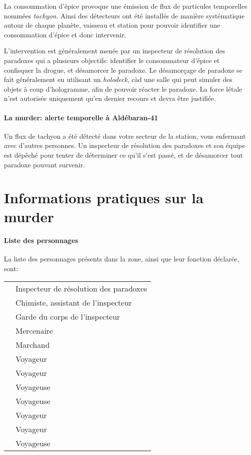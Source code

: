 {{		%
		\par La consommation d'épice provoque une émission de flux de particules temporelles nommées \emph{tachyon}. Ainsi des détecteurs ont été installés de manière systématique autour de chaque planète, vaisseau et station pour pouvoir identifier une consommation d'épice et donc intervenir.
		
		\par L'intervention est généralement menée par un inspecteur de résolution des paradoxes qui a plusieurs objectifs: identifier le consommateur d'épice et confisquer la drogue, et désamorcer le paradoxe. Le désamorçage de paradoxe se fait généralement en utilisant un \emph{holodeck}, càd une salle qui peut simuler des objets à coup d'hologramme, afin de pouvoir réacter le paradoxe. La force létale n'est autorisée uniquement qu'en dernier recours et devra être justifiée.
		
		\paragraph{La murder: alerte temporelle à Aldébaran-41} Un flux de tachyon a été détecté dans votre secteur de la station, vous enfermant avec d'autres personnes. Un inspecteur de résolution des paradoxes et son équipe est dépêché pour tenter de déterminer ce qu'il s'est passé, et de désamorcer tout paradoxe pouvant survenir.
	}
	
	
	\section{Informations pratiques sur la murder}
	
	\paragraph{Liste des personnages} La liste des personnages présents dans la zone, ainsi que leur fonction déclarée, sont:
	\begin{center}
	\begin{tabular}{|l||l|}
		\hline
		\emph{\nmPlayerVII} & Inspecteur de résolution des paradoxes\\
		\emph{\nmPlayerXII} & Chimiste, assistant de l'inspecteur\\
		\emph{\nmPlayerVIII} & Garde du corps de l'inspecteur\\
		\hline
		\emph{\nmPlayerX} & Mercenaire\\
		\emph{\nmPlayerII} & Marchand\\
		\emph{\nmPlayerXI} & Voyageur\\
		\emph{\nmPlayerI} & Voyageur\\
		\emph{\nmPlayerIX} & Voyageuse\\
		\emph{\nmPlayerVI} & Voyageuse\\
		\emph{\nmPlayerIII} & Voyageur\\
		\emph{\nmPlayerIV} & Voyageur\\
		\emph{\nmPlayerV} & Voyageuse\\
		\hline
	\end{tabular}
	\end{center}
	
}
